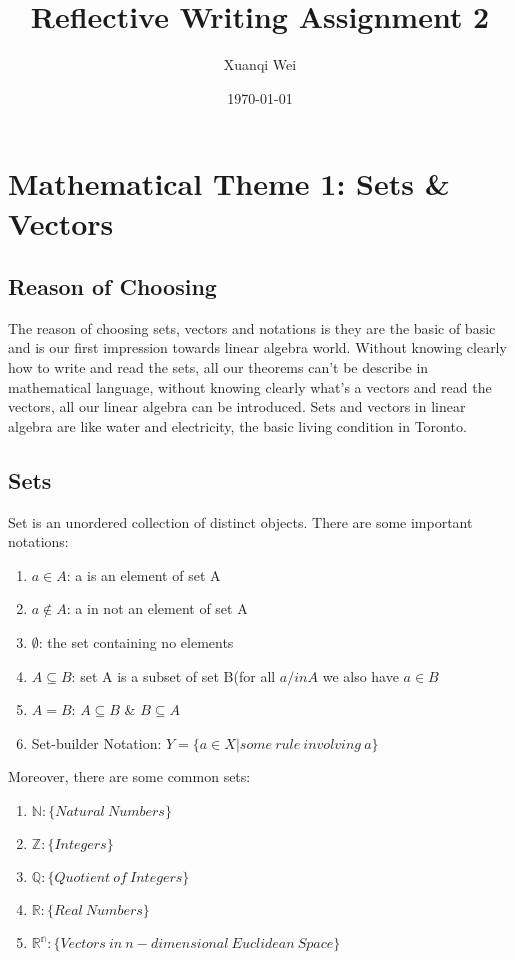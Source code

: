 \documentclass{article}
\title{Reflective Writing Assignment 2}
\author{Xuanqi Wei}
\date{\today}
\begin{document}
\maketitle
\thispagestyle{empty}

\newpage

\tableofcontents
\thispagestyle{empty}

\newpage

\setcounter{page}{1}

\section{Mathematical Theme 1: Sets \& Vectors}
\subsection{Reason of Choosing}
\quad The reason of choosing sets, vectors and notations is they are the basic of basic and is our first impression towards linear algebra world. Without knowing clearly how to write and read the sets, all our theorems can't be describe in mathematical language, without knowing clearly what's a vectors and read the vectors, all our linear algebra can be introduced. Sets and vectors in linear algebra are like water and electricity, the basic living condition in Toronto. 

\subsection{Sets}
\quad Set is an unordered collection of distinct objects. There are some important notations:
\begin{enumerate}
	\item $a \in A$: a is an element of set A
	\item $a \notin A $: a in not an element of set A
	\item $\emptyset$: the set containing no elements
	\item $A \subseteq B$: set A is a subset of set B(for all $a /in A$ we also have $a \in B$
	\item $A = B$: $A \subseteq B$ \& $B \subseteq A$
	\item Set-builder Notation: $Y = \{a \in X|some\ rule\ involving\ a \}$
\end{enumerate}

\quad Moreover, there are some common sets:
\begin{enumerate}
	\item $\mathbb{N}: \{Natural\ Numbers\}$
	\item $\mathbb{Z}: \{Integers\}$
	\item $\mathbb{Q}: \{Quotient\ of\ Integers\}$
	\item $\mathbb{R}: \{Real\ Numbers\}$
	\item $\mathbb{R^n}: \{Vectors\ in\ n-dimensional\ Euclidean\ Space\}$
\end{enumerate}
\end{document}
